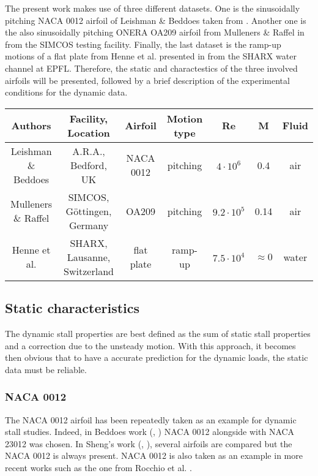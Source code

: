 The present work makes use of three different datasets. One is the sinusoidally pitching NACA 0012 airfoil of Leishman \& Beddoes taken from \cite{leishman_semi-empirical_1989}. Another one is the also sinusoidally pitching ONERA OA209 airfoil from Mulleners \& Raffel in \cite{mulleners_dynamic_2013} from the SIMCOS testing facility. Finally, the last dataset is the ramp-up motions of a flat plate from Henne et al. presented in \cite{henne_dynamic_2018} from the SHARX water channel at EPFL. Therefore, the static and charactestics of the three involved airfoils will be presented, followed by a brief description of the experimental conditions for the dynamic data.

\begin{tabular}{|c|c|c|c|c|c|c|}
	Authors & Facility, Location & Airfoil & Motion type & Re & M& Fluid \\
	\hline
	Leishman \& Beddoes & A.R.A., Bedford, UK & NACA 0012 & pitching & $4\cdot10^6$ & 0.4 & air \\
	Mulleners \& Raffel & SIMCOS, Göttingen, Germany & OA209 & pitching & $9.2 \cdot 10^5$ & 0.14 & air \\
	Henne et al. & SHARX, Lausanne, Switzerland & flat plate & ramp-up & $7.5 \cdot 10^4$ & $\approx 0$ & water \\
\end{tabular}

\subsection{Static characteristics}

The dynamic stall properties are best defined as the sum of static stall properties and a correction due to the unsteady motion. With this approach, it becomes then obvious that to have a accurate prediction for the dynamic loads, the static data must be reliable. 

\subsubsection{NACA 0012}

The NACA 0012 airfoil has been repeatedly taken as an example for dynamic stall studies. Indeed, in Beddoes work (\cite{beddoes_representation_1983}, \cite{leishman_semi-empirical_1989}) NACA 0012 alongside with NACA 23012 was chosen. In Sheng's work (\cite{sheng_new_2006}, \cite{sheng_improved_2007}), several airfoils are compared but the NACA 0012 is always present. NACA 0012 is also taken as an example in more recent works such as the one from Rocchio et al. \cite{rocchio_simple_2020}.

